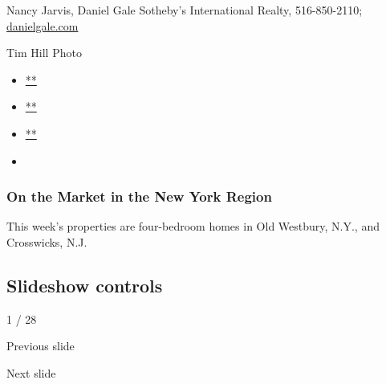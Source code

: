 Nancy Jarvis, Daniel Gale Sotheby's International Realty, 516-850-2110;
\href{https://www.nytimes.com/real-estate/usa/ny/old-westbury/homes-for-sale/6-pinewood-road/2836-96V8ZD?channel=sale\&locations\%5B\%5D=old-westbury-ny-usa\%2F6-Pinewood-Road-address}{danielgale.com}

Tim Hill Photo

\begin{itemize}
\item
  \href{https://www.facebook.com/sharer.php?app_id=9869919170\&u=https\%3A\%2F\%2Fwww.nytimes.com\%2Fslideshow\%2F2020\%2F07\%2F30\%2Frealestate\%2Fon-the-market-in-the-new-york-region.html\%3Fsmid\%3Dfb-share\&name=On\%20the\%20Market\%20in\%20the\%20New\%20York\%20Region\&redirect_uri=https\%3A\%2F\%2Fwww.facebook.com\%2F}{**}
\item
  \href{https://twitter.com/intent/tweet?url=https\%3A\%2F\%2Fwww.nytimes.com\%2Fslideshow\%2F2020\%2F07\%2F30\%2Frealestate\%2Fon-the-market-in-the-new-york-region.html\%3Fsmid\%3Dtw-share\&text=On\%20the\%20Market\%20in\%20the\%20New\%20York\%20Region}{**}
\item
  \href{mailto:?subject=NYTimes.com\%3A\%20On\%20the\%20Market\%20in\%20the\%20New\%20York\%20Region\&body=From\%20The\%20New\%20York\%20Times\%3A\%0A\%0AOn\%20the\%20Market\%20in\%20the\%20New\%20York\%20Region\%0A\%0AThis\%20week\%E2\%80\%99s\%20properties\%20are\%20four-bedroom\%20homes\%20in\%20Old\%20Westbury\%2C\%20N.Y.\%2C\%20and\%20Crosswicks\%2C\%20N.J.\%0A\%0Ahttps\%3A\%2F\%2Fwww.nytimes.com\%2Fslideshow\%2F2020\%2F07\%2F30\%2Frealestate\%2Fon-the-market-in-the-new-york-region.html\%3Fsmid\%3Dem-share}{**}
\item
\end{itemize}

\hypertarget{on-the-market-in-the-new-york-region-1}{%
\subsubsection{On the Market in the New York
Region}\label{on-the-market-in-the-new-york-region-1}}

This week's properties are four-bedroom homes in Old Westbury, N.Y., and
Crosswicks, N.J.

\hypertarget{slideshow-controls}{%
\subsection{Slideshow controls}\label{slideshow-controls}}

1 / 28

Previous slide

Next slide
